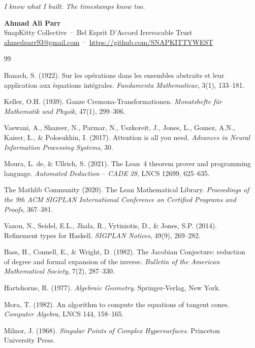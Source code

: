 \documentclass[12pt, letterpaper]{article}
\theoremstyle{plain}
\theoremstyle{definition}
\theoremstyle{remark}
\begin{document}
\medskip
\noindent\textit{I know what I built. The timestamps know too.}

\medskip
\noindent\textbf{Ahmad Ali Parr}\\
SnapKitty Collective · Bel Esprit D'Accord Irrevocable Trust\\
\url{ahmedparr93@gmail.com} · \url{https://github.com/SNAPKITTYWEST}


\begin{thebibliography}{99}

Banach, S. (1922).
Sur les op\'{e}rations dans les ensembles abstraits et leur application aux
\'{e}quations int\'{e}grales.
\textit{Fundamenta Mathematicae}, 3(1), 133--181.

Keller, O.H. (1939).
Ganze Cremona-Transformationen.
\textit{Monatshefte f\"{u}r Mathematik und Physik}, 47(1), 299--306.

Vaswani, A., Shazeer, N., Parmar, N., Uszkoreit, J., Jones, L., Gomez, A.N.,
Kaiser, \L., \& Polosukhin, I. (2017).
Attention is all you need.
\textit{Advances in Neural Information Processing Systems}, 30.

Moura, L. de, \& Ullrich, S. (2021).
The Lean~4 theorem prover and programming language.
\textit{Automated Deduction -- CADE 28}, LNCS 12699, 625--635.

The Mathlib Community (2020).
The Lean Mathematical Library.
\textit{Proceedings of the 9th ACM SIGPLAN International Conference on
Certified Programs and Proofs}, 367--381.

Vazou, N., Seidel, E.L., Jhala, R., Vytiniotis, D., \& Jones, S.P. (2014).
Refinement types for Haskell.
\textit{SIGPLAN Notices}, 49(9), 269--282.

Bass, H., Connell, E., \& Wright, D. (1982).
The Jacobian Conjecture: reduction of degree and formal expansion of the inverse.
\textit{Bulletin of the American Mathematical Society}, 7(2), 287--330.

Hartshorne, R. (1977).
\textit{Algebraic Geometry}.
Springer-Verlag, New York.

Mora, T. (1982).
An algorithm to compute the equations of tangent cones.
\textit{Computer Algebra}, LNCS 144, 158--165.

Milnor, J. (1968).
\textit{Singular Points of Complex Hypersurfaces}.
Princeton University Press.

\end{thebibliography}
\end{document}
